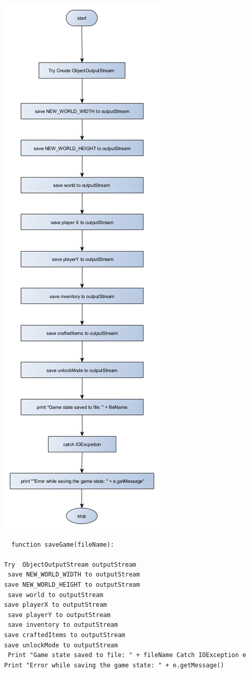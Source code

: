 {\includegraphics[height=\textheight]{../flowchart/saveGame.png}}

\begin{lstlisting}
  function saveGame(fileName):

Try  ObjectOutputStream outputStream
 save NEW_WORLD_WIDTH to outputStream 
save NEW_WORLD_HEIGHT to outputStream
 save world to outputStream 
save playerX to outputStream
 save playerY to outputStream
 save inventory to outputStream 
save craftedItems to outputStream 
save unlockMode to outputStream
 Print "Game state saved to file: " + fileName Catch IOException e 
Print "Error while saving the game state: " + e.getMessage() 

\end{lstlisting}


